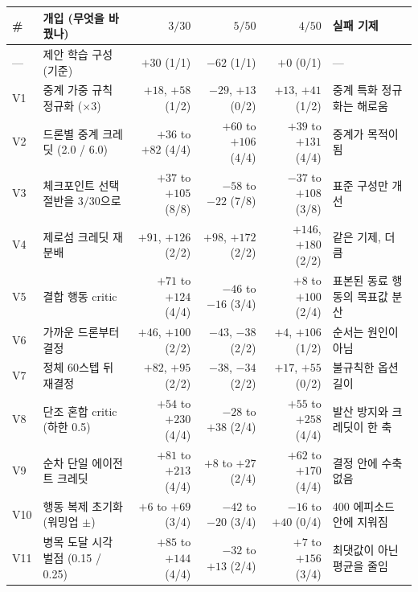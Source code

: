 \begin{tabular}{llrrrl}
\toprule
\# & 개입 (무엇을 바꿨나) & $3/30$ & $5/50$ & $4/50$ & 실패 기제 \\
\midrule
--- & 제안 학습 구성 (기준) & $+30$ (1/1) & $-62$ (1/1) & $+0$ (0/1) & --- \\
V1 & 중계 가중 규칙 정규화 ($\times 3$) & $+18$, $+58$ (1/2) & $-29$, $+13$ (0/2) & $+13$, $+41$ (1/2) & 중계 특화 정규화는 해로움 \\
V2 & 드론별 중계 크레딧 (2.0 / 6.0) & $+36$ to $+82$ (4/4) & $+60$ to $+106$ (4/4) & $+39$ to $+131$ (4/4) & 중계가 목적이 됨 \\
V3 & 체크포인트 선택 절반을 $3/30$으로 & $+37$ to $+105$ (8/8) & $-58$ to $-22$ (7/8) & $-37$ to $+108$ (3/8) & 표준 구성만 개선 \\
V4 & 제로섬 크레딧 재분배 & $+91$, $+126$ (2/2) & $+98$, $+172$ (2/2) & $+146$, $+180$ (2/2) & 같은 기제, 더 큼 \\
V5 & 결합 행동 critic & $+71$ to $+124$ (4/4) & $-46$ to $-16$ (3/4) & $+8$ to $+100$ (2/4) & 표본된 동료 행동의 목표값 분산 \\
V6 & 가까운 드론부터 결정 & $+46$, $+100$ (2/2) & $-43$, $-38$ (2/2) & $+4$, $+106$ (1/2) & 순서는 원인이 아님 \\
V7 & 정체 60스텝 뒤 재결정 & $+82$, $+95$ (2/2) & $-38$, $-34$ (2/2) & $+17$, $+55$ (0/2) & 불규칙한 옵션 길이 \\
V8 & 단조 혼합 critic (하한 0.5) & $+54$ to $+230$ (4/4) & $-28$ to $+38$ (2/4) & $+55$ to $+258$ (4/4) & 발산 방지와 크레딧이 한 축 \\
V9 & 순차 단일 에이전트 크레딧 & $+81$ to $+213$ (4/4) & $+8$ to $+27$ (2/4) & $+62$ to $+170$ (4/4) & 결정 안에 수축 없음 \\
V10 & 행동 복제 초기화 (워밍업 $\pm$) & $+6$ to $+69$ (3/4) & $-42$ to $-20$ (3/4) & $-16$ to $+40$ (0/4) & 400 에피소드 안에 지워짐 \\
V11 & 병목 도달 시각 벌점 (0.15 / 0.25) & $+85$ to $+144$ (4/4) & $-32$ to $+13$ (2/4) & $+7$ to $+156$ (3/4) & 최댓값이 아닌 평균을 줄임 \\
\bottomrule
\end{tabular}%
